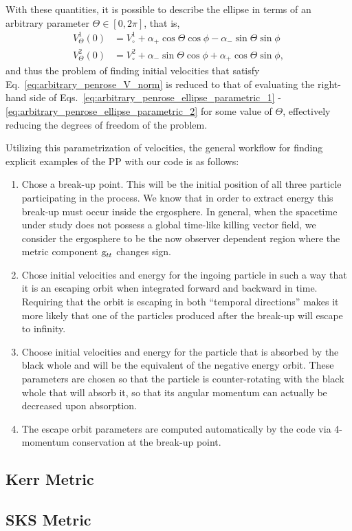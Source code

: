 With these quantities, it is possible to describe the ellipse in terms of an arbitrary parameter $\Theta \in \left[0,2\pi\right]$, that is,
%
\begin{align}
  V^{1}_{\Theta}(0) & =  V^{1}_\circ + \alpha_{+} \cos\Theta\cos\phi - \alpha_{-}\sin\Theta\sin\phi                                                  \label{eq:arbitrary_penrose_ellipse_parametric_1} \\
  V^{2}_{\Theta}(0) & = V^{2}_\circ + \alpha_{-} \sin\Theta\cos\phi + \alpha_{+}\cos\Theta\sin\phi, \label{eq:arbitrary_penrose_ellipse_parametric_2}
\end{align}
%
and thus the problem of finding initial velocities that satisfy Eq.~\eqref{eq:arbitrary_penrose_V_norm} is reduced to that of evaluating the right-hand side of Eqs.~\eqref{eq:arbitrary_penrose_ellipse_parametric_1} - \eqref{eq:arbitrary_penrose_ellipse_parametric_2} for some value of $\Theta$, effectively reducing the degrees of freedom of the problem.

Utilizing this parametrization of velocities, the general workflow for finding explicit examples of the PP with our code is as follows:

\begin{enumerate}
  \item Chose a break-up point. This will be the initial position of all three particle participating in the process. We know that in order to extract energy this break-up must occur inside the ergosphere. In general, when the spacetime under study does not possess a global time-like killing vector field, we consider the ergosphere to be the now observer dependent region where the metric component $\mtrtens{t}{t}$ changes sign.
  \item Chose initial velocities and energy for the ingoing particle in such a way that it is an escaping orbit when integrated forward and backward in time. Requiring that the orbit is escaping in both ``temporal directions'' makes it more likely that one of the particles produced after the break-up will escape to infinity.
  \item Choose initial velocities and energy for the particle that is absorbed by the black whole and will be the equivalent of the negative energy orbit. These parameters are chosen so that the particle is counter-rotating with the black whole that will absorb it, so that its angular momentum can actually be decreased upon absorption.
  \item The escape orbit parameters are computed automatically by the code via 4-momentum conservation at the break-up point.
\end{enumerate}

\subsection{Kerr Metric}
\label{ch:kerr_example}


\subsection{SKS Metric}
